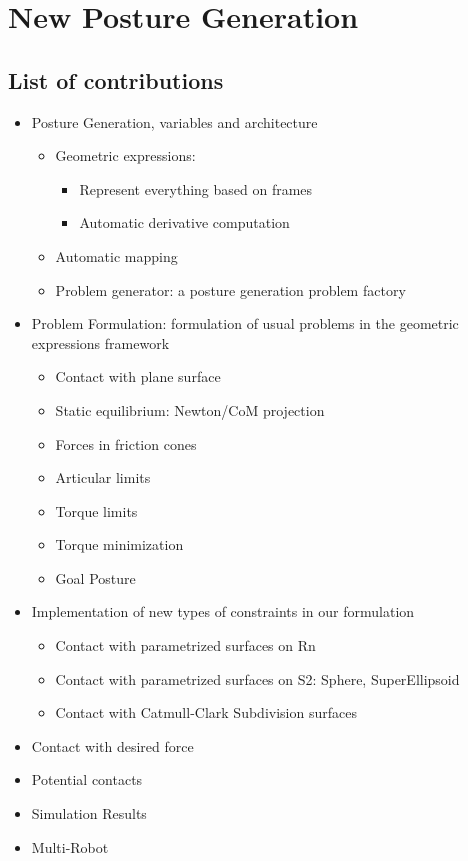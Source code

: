 

\chapter{
New Posture Generation
}

\section{List of contributions}
\begin{itemize}
  \item{Posture Generation, variables and architecture}
    \begin{itemize}
      \item Geometric expressions:
        \begin{itemize}
          \item Represent everything based on frames
          \item Automatic derivative computation
        \end{itemize}
      \item Automatic mapping
      \item Problem generator: a posture generation problem factory
    \end{itemize}
  \item{Problem Formulation: formulation of usual problems in the geometric expressions framework}
    \begin{itemize}
      \item Contact with plane surface
      \item Static equilibrium: Newton/CoM projection
      \item Forces in friction cones
      \item Articular limits
      \item Torque limits
      \item Torque minimization
      \item Goal Posture
    \end{itemize}
  \item{Implementation of new types of constraints in our formulation}
    \begin{itemize}
      \item Contact with parametrized surfaces on Rn
      \item Contact with parametrized surfaces on S2: Sphere, SuperEllipsoid
      \item Contact with Catmull-Clark Subdivision surfaces
    \end{itemize}
  \item{Contact with desired force}
  \item{Potential contacts}
  \item{Simulation Results}
  \item{Multi-Robot}
\end{itemize}

